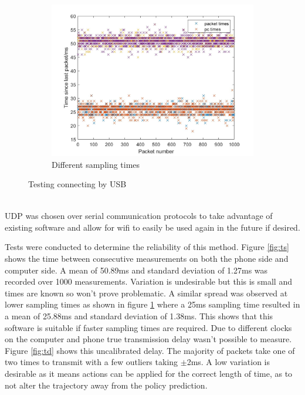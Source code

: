 \documentclass[twoside,twocolumn,12pt]{article}
\begin{document}
\begin{figure}[t]
\begin{subfigure}[t]{0.325\textwidth}
    \includegraphics[width=\linewidth]{both}
    \caption{Different sampling times}
  \label{fig:ts2}
  \end{subfigure}
  \caption{Testing connecting by USB}
  \label{fig:usb}
\end{figure}

\begin{align*}
[t, a_x, a_y ,a_z , \dot{\alpha}_x, \dot{\alpha}_y , \dot{\alpha}_z \#]
\end{align*}

UDP was chosen over serial communication protocols to take advantage of existing software and allow for wifi to easily be used again in the future if desired.

Tests were conducted to determine the reliability of this method. Figure \ref{fig:ts} shows the time between consecutive measurements on both the phone side and computer side. A mean of 50.89ms and standard deviation of 1.27ms was recorded over 1000 measurements. Variation is undesirable but this is small and times are known so won't prove problematic. A similar spread was observed at lower sampling times as shown in figure \ref{fig:ts2} where a 25ms sampling time resulted in a mean of 25.88ms and standard deviation of 1.38ms. This shows that this software is suitable if faster sampling times are required.
\newline
Due to different clocks on the computer and phone true transmission delay wasn't possible to measure. Figure \ref{fig:td} shows this uncalibrated delay. The majority of packets take one of two times to transmit with a few outliers taking $\pm$2ms. A low variation is desirable as it means actions can be applied for the correct length of time, as to not alter the trajectory away from the policy prediction.
\end{document}
